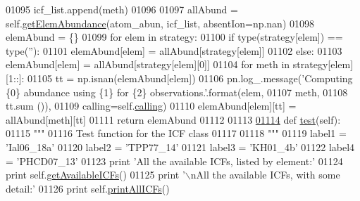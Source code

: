 \begin{DoxyCode}
{{{01095                     icf\_list.append(meth)
01096                 
01097         allAbund = self.\hyperlink{classpyneb_1_1core_1_1icf_1_1_i_c_f_a30b52d6d1ec148fba7c0a15cad653f61}{getElemAbundance}(atom\_abun, icf\_list, absentIon=np.nan)
01098         elemAbund = \{\}
01099         \textcolor{keywordflow}{for} elem \textcolor{keywordflow}{in} strategy:
01100             \textcolor{keywordflow}{if} type(strategy[elem]) == type(\textcolor{stringliteral}{''}):
01101                 elemAbund[elem] = allAbund[strategy[elem]]
01102             \textcolor{keywordflow}{else}:
01103                 elemAbund[elem] = allAbund[strategy[elem][0]]
01104                 \textcolor{keywordflow}{for} meth \textcolor{keywordflow}{in} strategy[elem][1::]:
01105                     tt = np.isnan(elemAbund[elem])
01106                     pn.log\_.message(\textcolor{stringliteral}{'Computing \{0\} abundance using \{1\} for \{2\} observations.'}.format(elem,
01107                                                                                                      meth,
01108                                                                                                      tt.sum
      ()),
01109                                     calling=self.\hyperlink{classpyneb_1_1core_1_1icf_1_1_i_c_f_aaeb9b3827ef557a32b109baef31da77f}{calling})
01110                     elemAbund[elem][tt] = allAbund[meth][tt]
01111         \textcolor{keywordflow}{return} elemAbund
01112 
01113 
\hypertarget{icf_8py_source_l01114}{}\hyperlink{classpyneb_1_1core_1_1icf_1_1_i_c_f_aa86aa126db5e94b56ccf995465858f72}{01114}     \textcolor{keyword}{def }\hyperlink{classpyneb_1_1core_1_1icf_1_1_i_c_f_aa86aa126db5e94b56ccf995465858f72}{test}(self):
01115         \textcolor{stringliteral}{""" }
01116 \textcolor{stringliteral}{        Test function for the ICF class }
01117 \textcolor{stringliteral}{}
01118 \textcolor{stringliteral}{        """}
01119         label1 = \textcolor{stringliteral}{'Ial06\_18a'}
01120         label2 = \textcolor{stringliteral}{'TPP77\_14'}
01121         label3 = \textcolor{stringliteral}{'KH01\_4b'}
01122         label4 = \textcolor{stringliteral}{'PHCD07\_13'}
01123         \textcolor{keywordflow}{print} \textcolor{stringliteral}{'All the available ICFs, listed by element:'}   
01124         \textcolor{keywordflow}{print} self.\hyperlink{classpyneb_1_1core_1_1icf_1_1_i_c_f_a45f65185e75b6f98d08656c918385b38}{getAvailableICFs}()
01125         \textcolor{keywordflow}{print} \textcolor{stringliteral}{'\(\backslash\)nAll the available ICFs, with some detail:'}   
01126         \textcolor{keywordflow}{print} self.\hyperlink{classpyneb_1_1core_1_1icf_1_1_i_c_f_a3b52e8d7dd5bb7a5a667cba328d9af7f}{printAllICFs}()
}}}
\end{DoxyCode}
